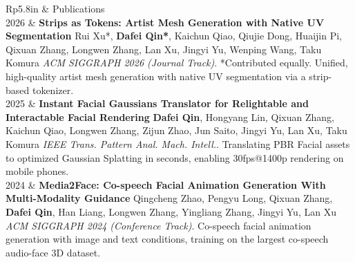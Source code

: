 \documentclass[letterpaper, 11pt]{article}
\newcommand{\headingfont}{\Large\color{OliveGreen}\vspace{-.4cm}}
\newenvironment{SectionTable}[1]{
	\renewcommand*{\arraystretch}{1.2}
	\setlength{\tabcolsep}{10pt} %
	\begin{longtable}{Rp{5.8in}} & #1 \\}
{\end{longtable}\vspace{-.4cm}}
\begin{document}

\begin{SectionTable}{\headingfont Publications}

2026 &
\textbf{Strips as Tokens: Artist Mesh Generation with Native UV Segmentation} \newline
Rui Xu*, \textbf{Dafei Qin*}, Kaichun Qiao, Qiujie Dong, Huaijin Pi, Qixuan Zhang, Longwen Zhang, Lan Xu, Jingyi Yu, Wenping Wang, Taku Komura \newline
\textit{ACM SIGGRAPH 2026 (Journal Track)}. \newline
*Contributed equally. \newline
Unified, high-quality artist mesh generation with native UV segmentation via a strip-based tokenizer. \\


2025 &
\textbf{Instant Facial Gaussians Translator for Relightable and Interactable Facial Rendering} \newline
\textbf{Dafei Qin}, Hongyang Lin, Qixuan Zhang, Kaichun Qiao, Longwen Zhang, Zijun Zhao, Jun Saito, Jingyi Yu, Lan Xu, Taku Komura \newline
\textit{IEEE Trans. Pattern Anal. Mach. Intell.}. \newline
Translating PBR Facial assets to optimized Gaussian Splatting in seconds, enabling 30fps@1400p rendering on mobile phones. \\

2024 & 
\textbf{Media2Face: Co-speech Facial Animation Generation With Multi-Modality Guidance} \newline
Qingcheng Zhao, Pengyu Long, Qixuan Zhang, \textbf{Dafei Qin}, Han Liang, Longwen Zhang, Yingliang Zhang, Jingyi Yu, Lan Xu \newline
\textit{ACM SIGGRAPH 2024 (Conference Track)}. \newline
Co-speech facial animation generation with image and text conditions, training on the largest co-speech audio-face 3D dataset. \\


\end{SectionTable}
\end{document}
